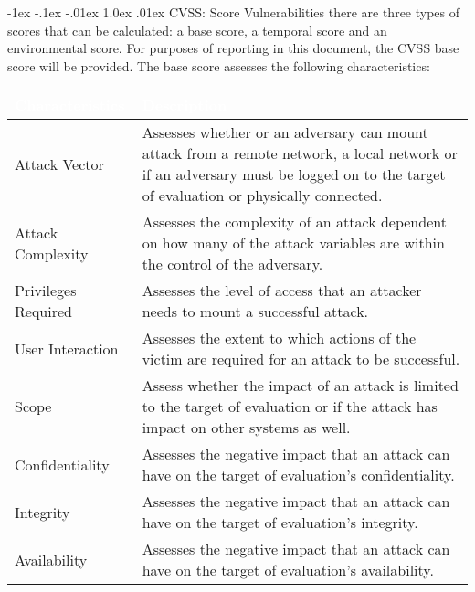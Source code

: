 \documentclass{article}
\makeatletter
\renewcommand{\section}{\@startsection{section}{1}{\z@}%
            {-1ex \@plus -.1ex \@minus -.01ex}%
            {1.0ex \@plus  .01ex}%
            {\normalfont\large\bfseries\color{sectioncolor}}}
\makeatother
\begin{document}
            \section{\large CVSS: Score Vulnerabilities}
            \large there are three types of scores that can be calculated: a base score, a temporal score and an environmental score. For purposes of reporting in this document, the CVSS base score will be provided. The base score assesses the following characteristics:
            \begin{center}
                \begin{longtable} {|p{9em}|p{31em}|}
                \hline 
                \large \cellcolor{tablecol} \textcolor{white}{\textbf{Characteristics}} & \large \cellcolor{tablecol} \textcolor{white}{\textbf{Description}}   \\    
                \hline
                \normalsize Attack Vector & \normalsize Assesses whether or an adversary can mount attack from a remote network, a local
                network or if an adversary must be logged on to the target of evaluation or physically
                connected.  \\
                \hline
                \normalsize Attack Complexity  & \normalsize Assesses the complexity of an attack dependent on how many of the attack variables are
                within the control of the adversary.  \\
                \hline
                \normalsize Privileges Required  & \normalsize Assesses the level of access that an attacker needs to mount a successful attack. \\
                \hline
                \normalsize User Interaction & \normalsize Assesses the extent to which actions of the victim are required for an attack to be
                successful. \\
                \hline
                \normalsize Scope & \normalsize Assess whether the impact of an attack is limited to the target of evaluation or if the attack
                has impact on other systems as well. \\
                \hline
                \normalsize Confidentiality & \normalsize Assesses the negative impact that an attack can have on the target of evaluation's
                confidentiality. \\
                \hline
                \normalsize Integrity & \normalsize Assesses the negative impact that an attack can have on the target of evaluation's
                integrity. \\
                \hline
                \normalsize Availability & \normalsize Assesses the negative impact that an attack can have on the target of evaluation's
                availability. \\
                \hline
                \end{longtable}   
            \end{center} 
\end{document}
